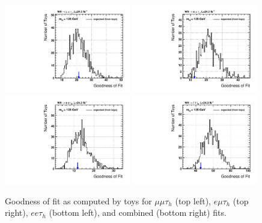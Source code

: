 \begin{figure}
\begin{center}
  \includegraphics[width=0.49\textwidth]{4_Analisys/pics/GoF/mmt-goodness-of-fit-125.pdf}
  \includegraphics[width=0.49\textwidth]{4_Analisys/pics/GoF/emt-goodness-of-fit-125.pdf}\\
  \includegraphics[width=0.49\textwidth]{4_Analisys/pics/GoF/eet-goodness-of-fit-125.pdf}
  \includegraphics[width=0.49\textwidth]{4_Analisys/pics/GoF/vhtt_wh-goodness-of-fit-125.pdf}\\
  \caption{Goodness of fit as computed by toys for $\mu\mu\tau_h$ (top left), $e\mu\tau_h$ (top right), $ee\tau_h$ (bottom left), and combined (bottom right) fits.}
  \label{fig:gof}
\end{center}
\end{figure}


